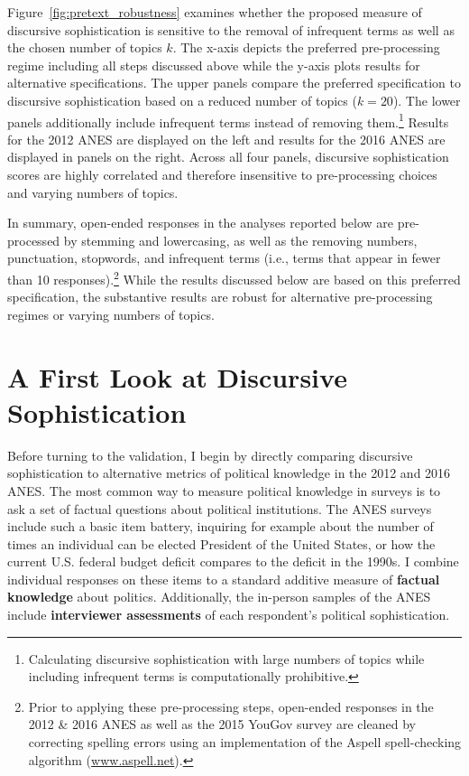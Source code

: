 \documentclass[12pt]{article}
\begin{document}
Figure~\ref{fig:pretext_robustness} examines whether the proposed measure of discursive sophistication is sensitive to the removal of infrequent terms as well as the chosen number of topics $k$. The x-axis depicts the preferred pre-processing regime including all steps discussed above while the y-axis plots results for alternative specifications. The upper panels compare the preferred specification to discursive sophistication based on a reduced number of topics ($k=20$). The lower panels additionally include infrequent terms instead of removing them.\footnote{Calculating discursive sophistication with large numbers of topics while including infrequent terms is computationally prohibitive.} Results for the 2012 ANES are displayed on the left and results for the 2016 ANES are displayed in panels on the right. Across all four panels, discursive sophistication scores are highly correlated and therefore insensitive to pre-processing choices and varying numbers of topics.

In summary, open-ended responses in the analyses reported below are pre-processed by stemming and lowercasing, as well as the removing numbers, punctuation, stopwords, and infrequent terms (i.e., terms that appear in fewer than 10 responses).\footnote{Prior to applying these pre-processing steps, open-ended responses in the 2012 \& 2016 ANES as well as the 2015 YouGov survey are cleaned by correcting spelling errors using an implementation of the Aspell spell-checking algorithm (\url{www.aspell.net}).} While the results discussed below are based on this preferred specification, the substantive results are robust for alternative pre-processing regimes or varying numbers of topics.



\section*{A First Look at Discursive Sophistication}

Before turning to the validation, I begin by directly comparing discursive sophistication to alternative metrics of political knowledge in the 2012 and 2016 ANES. The most common way to measure political knowledge in surveys is to ask a set of factual questions about political institutions. The ANES surveys include such a basic item battery, inquiring for example about the number of times an individual can be elected President of the United States, or how the current U.S. federal budget deficit compares to the deficit in the 1990s. I combine individual responses on these items to a standard additive measure of \textbf{factual knowledge} about politics. Additionally, the in-person samples of the ANES include \textbf{interviewer assessments} of each respondent's political sophistication.
\end{document}
